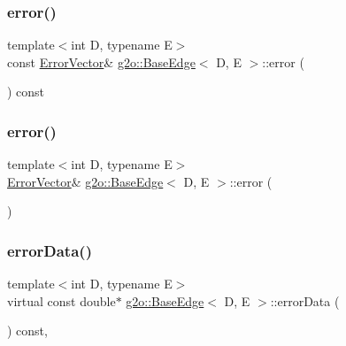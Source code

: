 \mbox{\label{classg2o_1_1_base_edge_ab5a17b29aa9be942157e089bb363a46c}} 
\subsubsection{\texorpdfstring{error()}{error()}\hspace{0.1cm}{\footnotesize\ttfamily [1/2]}}
{\footnotesize\ttfamily template$<$int D, typename E$>$ \\
const \mbox{\hyperlink{classg2o_1_1_base_edge_af5b558dd24e4be2e437563cae4b3550d}{Error\+Vector}}\& \mbox{\hyperlink{classg2o_1_1_base_edge}{g2o\+::\+Base\+Edge}}$<$ D, E $>$\+::error (\begin{DoxyParamCaption}{ }\end{DoxyParamCaption}) const\hspace{0.3cm}{\ttfamily [inline]}}

\mbox{\label{classg2o_1_1_base_edge_ad0a9e3b6d5490c8f4af794c77742faae}} 
\subsubsection{\texorpdfstring{error()}{error()}\hspace{0.1cm}{\footnotesize\ttfamily [2/2]}}
{\footnotesize\ttfamily template$<$int D, typename E$>$ \\
\mbox{\hyperlink{classg2o_1_1_base_edge_af5b558dd24e4be2e437563cae4b3550d}{Error\+Vector}}\& \mbox{\hyperlink{classg2o_1_1_base_edge}{g2o\+::\+Base\+Edge}}$<$ D, E $>$\+::error (\begin{DoxyParamCaption}{ }\end{DoxyParamCaption})\hspace{0.3cm}{\ttfamily [inline]}}

\mbox{\label{classg2o_1_1_base_edge_ad99fce6bad0207979b6211ac0d589015}} 
\subsubsection{\texorpdfstring{error\+Data()}{errorData()}\hspace{0.1cm}{\footnotesize\ttfamily [1/2]}}
{\footnotesize\ttfamily template$<$int D, typename E$>$ \\
virtual const double$\ast$ \mbox{\hyperlink{classg2o_1_1_base_edge}{g2o\+::\+Base\+Edge}}$<$ D, E $>$\+::error\+Data (\begin{DoxyParamCaption}{ }\end{DoxyParamCaption}) const\hspace{0.3cm}{\ttfamily [inline]}, {\ttfamily [virtual]}}



